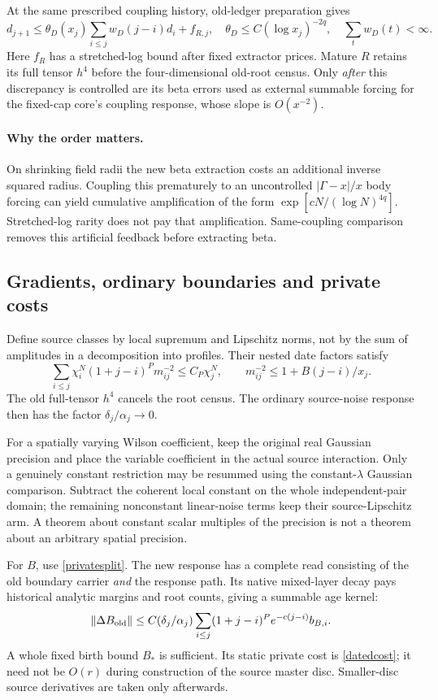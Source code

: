 \documentclass[11pt]{article}
\theoremstyle{definition}\newtheorem{definition}[theorem]{Definition}
\theoremstyle{remark}\newtheorem{remark}[theorem]{Remark}
\begin{document}
At the same prescribed coupling history, old-ledger preparation gives
\[
 d_{j+1}\leq\theta_D(x_j)\sum_{i\leq j}w_D(j-i)d_i+f_{R,j},
 \quad \theta_D\leq C(\log x_j)^{-2q},\quad\sum_tw_D(t)<\infty.
\]
Here $f_R$ has a stretched-log bound after fixed extractor prices. Mature $R$ retains its full tensor $h^4$ before the four-dimensional old-root census. Only \emph{after} this discrepancy is controlled are its beta errors used as external summable forcing for the fixed-cap core's coupling response, whose slope is $O(x^{-2})$.

\paragraph{Why the order matters.}
On shrinking field radii the new beta extraction costs an additional inverse squared radius. Coupling this prematurely to an uncontrolled $|\Gamma-x|/x$ body forcing can yield cumulative amplification of the form $\exp[cN/(\log N)^{4q}]$. Stretched-log rarity does not pay that amplification. Same-coupling comparison removes this artificial feedback before extracting beta.

\subsection{Gradients, ordinary boundaries and private costs}
Define source classes by local supremum and Lipschitz norms, not by the sum of amplitudes in a decomposition into profiles. Their nested date factors satisfy
\[
 \sum_{i\leq j}\chi_i^N(1+j-i)^P m_{ij}^{-2}\leq C_P\chi_j^N,
 \qquad m_{ij}^{-2}\leq1+B(j-i)/x_j.
\]
The old full-tensor $h^4$ cancels the root census. The ordinary source-noise response then has the factor $\delta_j/\alpha_j\to0$.

For a spatially varying Wilson coefficient, keep the original real Gaussian precision and place the variable coefficient in the actual source interaction. Only a genuinely constant restriction may be resummed using the constant-$\lambda$ Gaussian comparison. Subtract the coherent local constant on the whole independent-pair domain; the remaining nonconstant linear-noise terms keep their source-Lipschitz arm. A theorem about constant scalar multiples of the precision is not a theorem about an arbitrary spatial precision.

For $B$, use \eqref{privatesplit}. The new response has a complete read consisting of the old boundary carrier \emph{and} the response path. Its native mixed-layer decay pays historical analytic margins and root counts, giving a summable age kernel:
\[
 \|\Delta B_{\rm old}\|\leq C(\delta_j/\alpha_j)
 \sum_{i\leq j}(1+j-i)^P e^{-c(j-i)}b_{B,i}.
\]
A whole fixed birth bound $B_*$ is sufficient. Its static private cost is \eqref{datedcost}; it need not be $O(r)$ during construction of the source master disc. Smaller-disc source derivatives are taken only afterwards.
\end{document}
